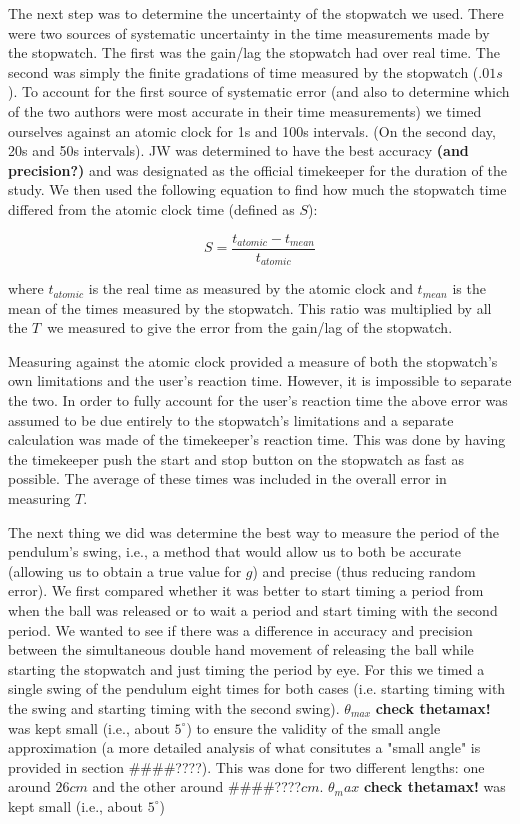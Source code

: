 \documentclass[iop]{emulateapj}
\def\g{$g$}
\def\T{$T$}
\def\fillin{\#\#\#\#????}
\def\deg{^{\circ}}
\begin{document}
The next step was to determine the uncertainty of the stopwatch we used. 
There were two sources of systematic 
uncertainty in the time measurements made by the stopwatch.  The first was the 
gain/lag the stopwatch had over real time.  The second was simply the finite 
gradations of time measured by the stopwatch ($.01 s$).  To account for the 
first source of systematic error (and also to determine which of the two 
authors were most accurate in their time measurements) we timed 
ourselves against an atomic clock for 1s and 100s intervals.  (On the second
day, 20s and 50s intervals). JW 
was determined to have the best accuracy {\bf (and precision?)} and was 
designated as the official timekeeper for the duration of the study.  
We then used the following equation to find how much the stopwatch time
differed from the atomic clock time (defined as $S$):

\begin{equation}
\label{eq:S}
S=\frac{t_{atomic}-t_{mean}}{t_{atomic}} 
\end{equation}

where $t_{atomic}$ is the real time as measured by the 
atomic clock 
and $t_{mean}$ is the mean of the times measured by the 
stopwatch.  This ratio was multiplied by all the \T\ we measured to give
the error from the gain/lag of the stopwatch.

Measuring against the atomic clock provided a measure of both the stopwatch's 
own limitations and the user's reaction time.  However, it is impossible to 
separate the two.  In order to fully account for the user's reaction time the 
above error was assumed to be due entirely to the stopwatch's limitations and 
a separate calculation was made of the timekeeper's reaction time.  This was 
done by having the timekeeper push the start and stop button on the 
stopwatch as fast as possible.  The average of these times was included in 
the overall error in measuring \T.

The next thing we did was determine the best way to measure the period of the 
pendulum's swing, i.e., a method that would allow us to both be accurate 
(allowing us to obtain a true value for \g) and precise (thus reducing random 
error). We first compared whether it was better to start timing a period from 
when the ball was released or to wait a period and start timing with the 
second period.  We wanted to see if there was a difference in accuracy and 
precision between the simultaneous double hand movement of releasing the ball 
while starting the stopwatch and just timing the period by eye. For this we 
timed a single swing of the pendulum eight times for both cases (i.e. starting 
timing with the swing and starting timing with the second swing). $\theta_{max}$ 
{\bf check thetamax!} was kept small (i.e., about $5\deg$) to ensure the 
validity of the small angle approximation (a more detailed analysis of what 
consitutes a "small angle" is provided in section \fillin). This was done 
for two different lengths: one around $26cm$ and the other around \fillin$cm$. 
$\theta_max$ {\bf check thetamax!} was kept small (i.e., about $5\deg$) 
\end{document}
